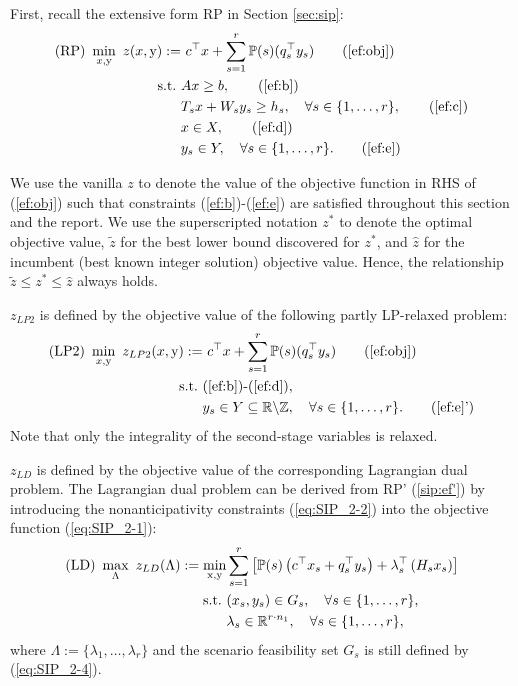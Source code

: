 First, recall the extensive form RP in Section \ref{sec:sip}:
\begin{subequations}\label{ef}
	\begin{align}
	\textrm{(RP) }\min_{x,\mathrm{y}}\ z(x,\mathrm{y}):=&\ c^{\top}x + \sum_{s=1}^{r}\PP(s) (q_s^{\top}y_s) \tag{\ref{ef:obj}}\\ 
	\mathrm{s.t.}\ &Ax\ge b,  \tag{\ref{ef:b}}\\
	&T_s x+W_s y_s\ge h_s,\quad\forall s\in\{1,\ldots,r\}, \tag{\ref{ef:c}} \\
	&x\in X, \tag{\ref{ef:d}} \\
	&y_s \in Y,\quad\forall s\in\{1,\ldots,r\}. \tag{\ref{ef:e}}
	\end{align}
\end{subequations}

We use the vanilla $z$ to denote the value of the objective function in RHS of (\ref{ef:obj}) such that constraints (\ref{ef:b})-(\ref{ef:e}) are satisfied throughout this section and the report. We use the superscripted notation $z^*$ to denote the optimal objective value, $\tilde{z}$ for the best lower bound discovered for $z^*$, and $\hat{z}$ for the incumbent (best known integer solution) objective value. Hence, the relationship $\tilde{z}\le z^*\le\hat{z}$ always holds.

$z_{LP2}$ is defined by the objective value of the following partly LP-relaxed problem:
\begin{subequations}\label{ef-lp2}
	\begin{align}
	\textrm{(LP2) }\min_{x,\mathrm{y}}\ z_{LP2}(x,\mathrm{y}):=&\ c^{\top}x + \sum_{s=1}^{r}\PP(s) (q_s^{\top}y_s) \tag{\ref{ef:obj}}\\ 
	\mathrm{s.t.}\ &\textrm{(\ref{ef:b})-(\ref{ef:d})}, \nonumber \\
	& y_s \in Y \subseteq \mathbb{R}\backslash\mathbb{Z} ,\quad\forall s\in\{1,\ldots,r\}. \tag{\ref{ef:e}'}
	\end{align}
\end{subequations}
Note that only the integrality of the second-stage variables is relaxed.

$z_{LD}$ is defined by the objective value of the corresponding Lagrangian dual problem. The Lagrangian dual problem can be derived from RP' (\ref{sip:ef'}) by introducing the nonanticipativity constraints (\ref{eq:SIP_2-2}) into the objective function (\ref{eq:SIP_2-1}):
\begin{subequations}\label{ld}
	\begin{align}
	\textrm{(LD) }\max_{\Lambda}\ z_{LD}(\Lambda) :=\min_{\mathrm{x},\mathrm{y}}  &\sum_{s=1}^{r}\left[\operatorname*{\mathbb{P}}(s)\left(c^{\top}x_s+q_s^{\top}y_s\right)+\lambda_s^\top \left(H_s x_s\right)\right] \label{ld:obj}\\ 
	\mathrm{s.t.}\ & (x_s,y_s)\in G_s,\quad \forall s\in\{1,\ldots,r\},	 \label{ld:b}\\
	&\lambda_s\in\mathbb{R}^{r\cdot n_1},\quad \forall s\in\{1,\ldots,r\}, \label{ld:c}
	\end{align}
\end{subequations}
where $\Lambda:=\{\lambda_1,\ldots,\lambda_r\}$ and the scenario feasibility set $G_s$ is still defined by (\ref{eq:SIP_2-4}).

